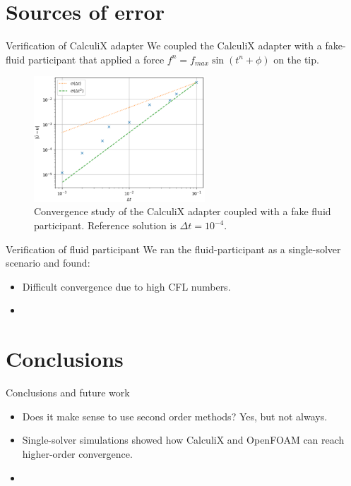 \documentclass[
  english,            %
  aspectratio=43,    %
]{tumbeamer}
\begin{document}
\section{Sources of error}
\begin{frame}{Verification of CalculiX adapter}
We coupled the CalculiX adapter with a fake-fluid participant that applied a force $f^n = f_{max} \sin(t^n + \phi)$ on the tip.

\vspace*{\fill}
\begin{figure}[!ht]
    \centering
    \includegraphics[width=0.57\textwidth]{resources/fake_fluid.png}
    \caption{Convergence study of the CalculiX adapter coupled with a fake fluid participant. Reference solution is $\Delta t = 10^{-4}$.}
    \label{fig:fake-fluid}
\end{figure}
\end{frame}

\begin{frame}{Verification of fluid participant}
    We ran the fluid-participant as a single-solver scenario and found: 
    \begin{itemize}
        \item Difficult convergence due to high CFL numbers.
        \item 
    \end{itemize}
\end{frame}

\section{Conclusions}
\begin{frame}{Conclusions and future work}
    \begin{itemize}
        \item Does it make sense to use second order methods? Yes, but not always.
        \vspace{15pt}
        \item Single-solver simulations showed how CalculiX and OpenFOAM can reach higher-order convergence.
        \vspace{15pt}
        \item 
        
    \end{itemize}

    
\end{frame}
\end{document}
